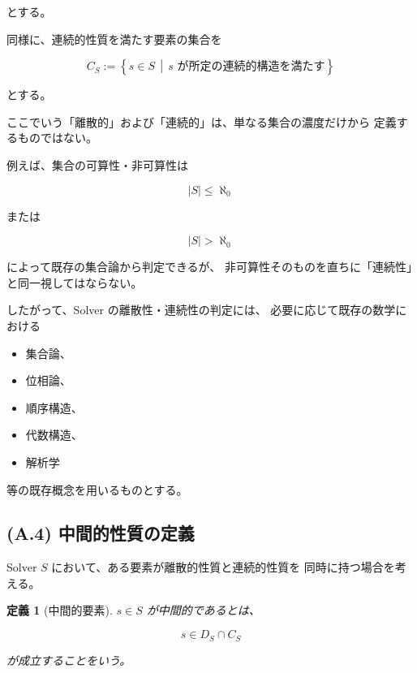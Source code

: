 \documentclass[a4paper,11pt]{article}
\newtheorem{definition}{定義}[section]
\begin{document}
とする。

同様に、連続的性質を満たす要素の集合を

\begin{equation}
    C_S
    :=
    \left\{
        s\in S
        \,\middle|\,
        s\text{ が所定の連続的構造を満たす}
    \right\}
    \label{eq:A-continuous-elements}
\end{equation}

とする。

ここでいう「離散的」および「連続的」は、単なる集合の濃度だけから
定義するものではない。

例えば、集合の可算性・非可算性は

\begin{equation}
    |S|\leq\aleph_0
\end{equation}

または

\begin{equation}
    |S|>\aleph_0
\end{equation}

によって既存の集合論から判定できるが、
非可算性そのものを直ちに「連続性」と同一視してはならない。

したがって、Solver の離散性・連続性の判定には、
必要に応じて既存の数学における

\begin{itemize}
    \item 集合論、
    \item 位相論、
    \item 順序構造、
    \item 代数構造、
    \item 解析学
\end{itemize}

等の既存概念を用いるものとする。


\subsection{(A.4) 中間的性質の定義}
\label{subsec:A4}

Solver $S$ において、ある要素が離散的性質と連続的性質を
同時に持つ場合を考える。

\begin{definition}[中間的要素]
$s\in S$ が中間的であるとは、

\begin{equation}
    s\in D_S\cap C_S
    \label{eq:A-intermediate-element}
\end{equation}

が成立することをいう。
\end{definition}
\end{document}
